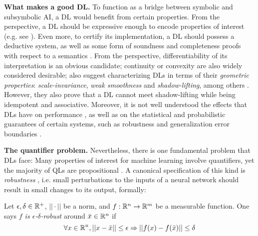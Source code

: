\textbf{What makes a good DL.} To function as a bridge between symbolic and subsymbolic AI, a DL would benefit from certain properties. From the \SiAI{} perspective, a DL should be expressive enough to encode properties of interest (e.g. see \citep{daggitt2024vehicle}). Even more, to certify its implementation, a DL should possess a deductive system, as well as some form of soundness and completeness proofs with respect to a semantics \citep{floyd1993assigning, goguen1977initial}. From the \SuAI{} perspective, differentiability of its interpretation is an obvious candidate; continuity or convexity are also widely considered desirable; \citeauthor{varnai2020robustness} also suggest characterizing DLs in terms of their \textit{geometric properties}: \emph{scale-invariance}, \emph{weak smoothness} and \emph{shadow-lifting}, among others \citep{varnai2020robustness}. However, they also prove that a DL cannot meet shadow-lifting while being idempotent and associative. Moreover, it is not well understood the effects that DLs have on performance \citep{flinkow2025generalised}, as well as on the statistical and probabilistic guarantees of certain systems, such as robustness \citep{casadio2022neural} and generalization error boundaries \citep{jakubovitz2019generalization}.


\textbf{The quantifier problem.} Nevertheless, there is one fundamental problem that DLs face: Many properties of interest for machine learning involve quantifiers, yet the majority of QLs are propositional \citep{bacci2024polynomial, bacci2023propositional, bacci2025induction}. A canonical specification of this kind is  \textit{robustness} \citep{casadio2022neural},  i.e. small perturbations to the inputs of a neural network should result in small changes to its output, formally:
\begin{definition} %
\label{Robustness}%
    Let $\epsilon, \delta \in \mathbb{R}^+$, $||\cdot||$ be a norm, and $f : \mathbb{R}^n \rightarrow \mathbb{R}^m$ be a measurable function.
    One says \textit{$f$ is $\epsilon$-$\delta$-robust} around $\bar x \in \mathbb{R} ^ n$ if 
    \begin{equation}
    \label{eq:robustness}
        \forall x\in \mathbb{R}^n , ||x - \bar x|| \leq \epsilon \Rightarrow || 
			f(x) - f(\bar x)|| \leq \delta  
    \end{equation}
\end{definition}

